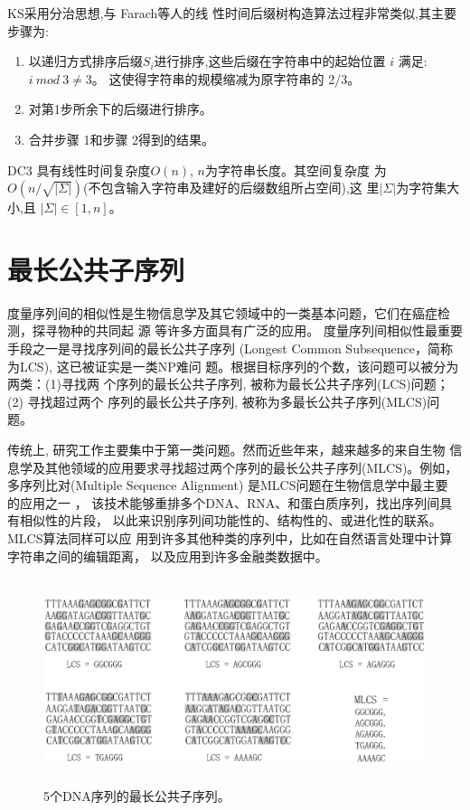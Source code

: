 KS\cite{Karkkainen2006}采用分治思想,与 Farach\cite{Farach1997}等人的线
性时间后缀树构造算法过程非常类似,其主要步骤为:

\begin{enumerate}
\item 以递归方式排序后缀$S_i$进行排序,这些后缀在字符串中的起始位置 $i$
  满足: $i~ mod~ 3 \neq 3$。 这使得字符串的规模缩减为原字符串的 2/3。
\item 对第1步所余下的后缀进行排序。
\item 合并步骤 1和步骤 2得到的结果。
\end{enumerate}

DC3 具有线性时间复杂度$O(n)$, $n$为字符串长度。其空间复杂度
为 $O(n/\sqrt{|\Sigma|})$(不包含输入字符串及建好的后缀数组所占空间),这
里$|\Sigma|$为字符集大小,且 $|\Sigma| \in [1, n]$。


\section{最长公共子序列}

度量序列间的相似性是生物信息学及其它领域中的一类基本问题，它们在癌症检
测\cite{Aravanis2017,Chattopadhyay2016,Munday2017}，探寻物种的共同起
源 \cite{Zvelebil2007,Perry2015,Donnell2015} 等许多方面具有广泛的应用。
度量序列间相似性最重要手段之一是寻找序列间的最长公共子序列 (Longest
Common Subsequence，简称为LCS), 这已被证实是一类NP难问
题\cite{Maier1978}。根据目标序列的个数，该问题可以被分为两类：(1)寻找两
个序列的最长公共子序列, 被称为最长公共子序列(LCS)问题；(2) 寻找超过两个
序列的最长公共子序列, 被称为多最长公共子序列(MLCS)问题。

传统上, 研究工作主要集中于第一类问题。然而近些年来，越来越多的来自生物
信息学及其他领域的应用要求寻找超过两个序列的最长公共子序列(MLCS)。例如，
多序列比对(Multiple Sequence Alignment) 是MLCS问题在生物信息学中最主要
的应用之一 \cite{Katoh2016,Zou2015,Mirarab2015,Bawono2017,Chatzou2015}，
该技术能够重排多个DNA、RNA、和蛋白质序列，找出序列间具有相似性的片段，
以此来识别序列间功能性的、结构性的、或进化性的联系。 MLCS算法同样可以应
用到许多其他种类的序列中，比如在自然语言处理中计算字符串之间的编辑距离，
以及应用到许多金融类数据中。

\begin{figure}[H]
  \centering
  \includegraphics[height=6cm ,width=15cm]{figures/1_Introduction/MLCS.eps}
  \caption{5个DNA序列的最长公共子序列。}
  \label{fig:MLCS}
\end{figure}


